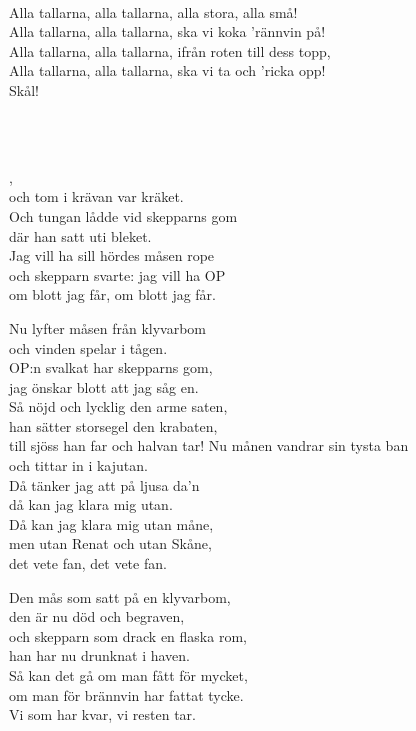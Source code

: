 \newpage

 \\       
\author{Text: Lars T. Johansson och Ehrling Eliasson}

\songtext{}
Alla tallarna, alla tallarna, alla stora, alla små!\\
Alla tallarna, alla tallarna, ska vi koka 'rännvin på!\\
Alla tallarna, alla tallarna, ifrån roten till dess topp,\\
Alla tallarna, alla tallarna, ska vi ta och 'ricka opp!\\
Skål! 

 \\

 \\       

,\\
och tom i krävan var kräket.\\
Och tungan lådde vid skepparns gom\\
där han satt uti bleket.\\
Jag vill ha sill hördes måsen rope\\
och skepparn svarte: jag vill ha OP\\
om blott jag får, om blott jag får.

Nu lyfter måsen från klyvarbom\\
och vinden spelar i tågen.\\
OP:n svalkat har skepparns gom,\\
jag önskar blott att jag såg en.\\
Så nöjd och lycklig den arme saten,\\
han sätter storsegel den krabaten,\\
till sjöss han far och halvan tar!
\newpage
Nu månen vandrar sin tysta ban\\
och tittar in i kajutan.\\
Då tänker jag att på ljusa da'n\\
då kan jag klara mig utan.\\
Då kan jag klara mig utan måne,\\
men utan Renat och utan Skåne,\\
det vete fan, det vete fan.

Den mås som satt på en klyvarbom,\\
den är nu död och begraven,\\
och skepparn som drack en flaska rom,\\
han har nu drunknat i haven.\\
Så kan det gå om man fått för mycket,\\
om man för brännvin har fattat tycke.\\
Vi som har kvar, vi resten tar. \\

